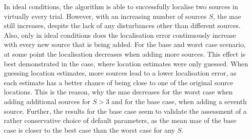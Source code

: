 In ideal conditions, the algorithm is able to successfully localise two sources in virtually every trial. However, with an increasing number of sources $S$, the \gls{mae} still increases, despite the lack of any disturbances other than different sources. Also, only in ideal conditions does the localisation error continuously increase with every new source that is being added. For the base and worst case scenario, at some point the localisation decreases when adding more sources. This effect is best demonstrated in the case, where location estimates were only guessed. When guessing location estimates, more sources lead to a lower localisation error, as each estimate has a better chance of being close to one of the original source locations. This is the reason, why the \gls{mae} decreases for the worst case when adding additional sources for $S>3$ and for the base case, when adding a seventh source. Further, the results for the base case seem to validate the assessment of a rather conservative choice of default parameters, as the mean \gls{mae} of the base case is closer to the best case than the worst case for any $S$.